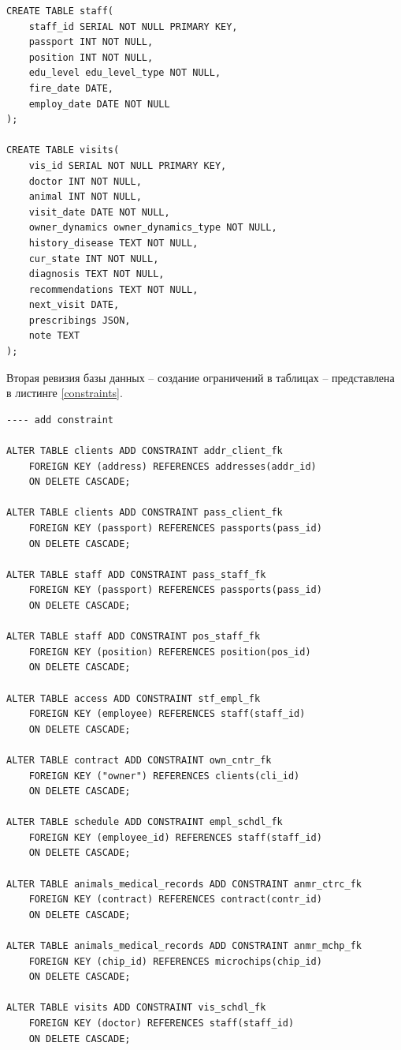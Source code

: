 \documentclass[a4paper,14pt]{article}
\begin{document}
\begin{lstlisting}[label=tables,caption=\text{Создание таблиц БД.}]
CREATE TABLE staff(
	staff_id SERIAL NOT NULL PRIMARY KEY,
	passport INT NOT NULL,
	position INT NOT NULL,
	edu_level edu_level_type NOT NULL,
	fire_date DATE,
	employ_date DATE NOT NULL
);

CREATE TABLE visits(
    vis_id SERIAL NOT NULL PRIMARY KEY,
    doctor INT NOT NULL,
    animal INT NOT NULL,
    visit_date DATE NOT NULL,
    owner_dynamics owner_dynamics_type NOT NULL,
    history_disease TEXT NOT NULL,
    cur_state INT NOT NULL,
    diagnosis TEXT NOT NULL,
    recommendations TEXT NOT NULL,
    next_visit DATE,
    prescribings JSON,
    note TEXT
);
\end{lstlisting}

Вторая ревизия базы данных -- создание ограничений в таблицах -- представлена в листинге \ref{constraints}.

\begin{lstlisting}[label=constraints,caption=\text{Создание органичений.}]
---- add constraint

ALTER TABLE clients ADD CONSTRAINT addr_client_fk 
	FOREIGN KEY (address) REFERENCES addresses(addr_id) 
	ON DELETE CASCADE;
	
ALTER TABLE clients ADD CONSTRAINT pass_client_fk 
	FOREIGN KEY (passport) REFERENCES passports(pass_id) 
	ON DELETE CASCADE;
	
ALTER TABLE staff ADD CONSTRAINT pass_staff_fk 
	FOREIGN KEY (passport) REFERENCES passports(pass_id) 
	ON DELETE CASCADE;
	
ALTER TABLE staff ADD CONSTRAINT pos_staff_fk 
	FOREIGN KEY (position) REFERENCES position(pos_id) 
	ON DELETE CASCADE;
	
ALTER TABLE access ADD CONSTRAINT stf_empl_fk 
	FOREIGN KEY (employee) REFERENCES staff(staff_id) 
	ON DELETE CASCADE;
	
ALTER TABLE contract ADD CONSTRAINT own_cntr_fk 
	FOREIGN KEY ("owner") REFERENCES clients(cli_id) 
	ON DELETE CASCADE;
	
ALTER TABLE schedule ADD CONSTRAINT empl_schdl_fk 
	FOREIGN KEY (employee_id) REFERENCES staff(staff_id) 
	ON DELETE CASCADE;
	
ALTER TABLE animals_medical_records ADD CONSTRAINT anmr_ctrc_fk 
	FOREIGN KEY (contract) REFERENCES contract(contr_id) 
	ON DELETE CASCADE;
	
ALTER TABLE animals_medical_records ADD CONSTRAINT anmr_mchp_fk 
	FOREIGN KEY (chip_id) REFERENCES microchips(chip_id) 
	ON DELETE CASCADE;
	
ALTER TABLE visits ADD CONSTRAINT vis_schdl_fk 
	FOREIGN KEY (doctor) REFERENCES staff(staff_id) 
	ON DELETE CASCADE;
	

\end{lstlisting}
\end{document}
